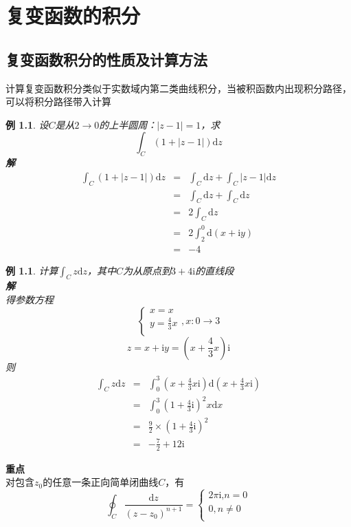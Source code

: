 \documentclass[12pt, a4paper, twoside]{ctexbook}
\newtheorem{example}[theorem]{例}
\begin{document}
\chapter{复变函数的积分}
\newpage
\section{复变函数积分的性质及计算方法}
计算复变函数积分类似于实数域内第二类曲线积分，当被积函数内出现积分路径，可以将积分路径带入计算
\begin{example}
	设$C$是从$2\to0$的上半圆周：$\left|z-1\right|=1$，求
	$$
	\int_C\left(1+\left|z-1\right|\right)\mathrm{d}z
	$$
	\hspace*{1em}\textbf{解}
    \begin{eqnarray}
        \int_C\left(1+\left|z-1\right|\right)\mathrm{d}z&=&\int_C\mathrm{d}z+\int_C\left|z-1\right|\mathrm{d}z \nonumber      \\
        ~&=&\int_C\mathrm{d}z+\int_C\mathrm{d}z  \nonumber    \\
        ~&=&2\int_C\mathrm{d}z \nonumber		\\
		~&=&2\int_2^0\mathrm{d}\left(x+\mathrm{i}y\right) \nonumber  \\
		~&=&-4 \nonumber
    \end{eqnarray}
\end{example}

\begin{example}
	计算$\int_C z\mathrm{d}z$，其中$C$为从原点到$3+4\mathrm{i}$的直线段\\
	\hspace*{1em}\textbf{解}\\
    \hspace*{2em}得参数方程
	$$
	\left\{ \begin{array}{l}
		x=x\\
		y=\frac{4}{3}x\\
	\end{array},x:0\rightarrow 3 \right. 
	$$
	$$
	z=x+\mathrm{i}y=\left( x+\frac{4}{3}x\right) \mathrm{i}
	$$
	\hspace*{2em}则
    \begin{eqnarray}
        \int_C z\mathrm{d}z&=&\int_0^3\left(x+\frac{4}{3}x\mathrm{i}\right)\mathrm{d}\left(x+\frac{4}{3}x\mathrm{i}\right) \nonumber      \\
        ~&=&\int_0^3\left(1+\frac{4}{3}\mathrm{i}\right)^2x\mathrm{d}x \nonumber    \\
        ~&=&\frac{9}{2}\times \left(1+\frac{4}{3}\mathrm{i}\right)^2 \nonumber		\\
		~&=&-\frac{7}{2}+12\mathrm{i} \nonumber
    \end{eqnarray}
\end{example}
\textbf{重点}\\
对包含$z_0$的任意一条正向简单闭曲线$C$，有
$$
\oint_C{\frac{\text{d}z}{\left( z-z_0 \right) ^{n+1}}}=\left\{ \begin{array}{l}
	2\pi \text{i,}n=0\\
	0,n\neq 0\\
\end{array} \right. 
$$
\end{document}
